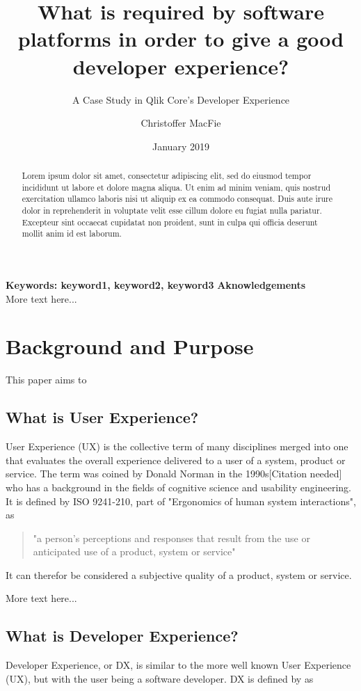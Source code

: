\documentclass{article}
\title{What is required by software platforms in order to give a good developer experience?}
\subtitle{A Case Study in Qlik Core's Developer Experience}
\author{Christoffer MacFie}
\date{January 2019}
\begin{document}
\maketitle
\newpage
\newpage
\begin{abstract}
Lorem ipsum dolor sit amet, consectetur adipiscing elit, sed do eiusmod tempor incididunt ut labore et dolore magna aliqua. Ut enim ad minim veniam, quis nostrud exercitation ullamco laboris nisi ut aliquip ex ea commodo consequat. Duis aute irure dolor in reprehenderit in voluptate velit esse cillum dolore eu fugiat nulla pariatur. Excepteur sint occaecat cupidatat non proident, sunt in culpa qui officia deserunt mollit anim id est laborum.
\end{abstract}
\textbf{Keywords: keyword1, keyword2, keyword3}
\newpage
\Large{\textbf{Aknowledgements}} \\
\normalsize
More text here...
\newpage
\tableofcontents
\newpage

\section{Background and Purpose}

This paper aims to

\subsection{What is User Experience?}

User Experience (UX) is the collective term of many disciplines merged
into one that evaluates the overall experience delivered to a user of a
system, product or service. The term was coined by Donald Norman in the
1990s[Citation needed] who has a background in the fields of cognitive
science and usability engineering. It is defined by ISO 9241-210, part
of "Ergonomics of human system interactions", as \begin{quote}
"a person's perceptions and responses that result from the use or anticipated use of
a product, system or service"
\end{quote}
It can therefor be considered a
subjective quality of a product, system or service.

More text here...
\subsection{What is Developer Experience?}

Developer Experience, or DX, is similar to the more well known User
Experience (UX), but with the user being a software developer. DX is
defined by \cite{jarman} as
\end{document}
